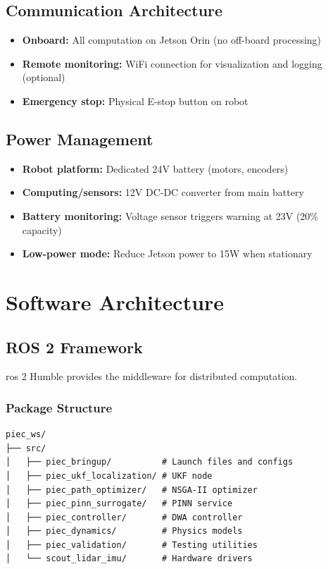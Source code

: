 \subsection{Communication Architecture}

\begin{itemize}
    \item \textbf{Onboard:} All computation on Jetson Orin (no off-board processing)
    \item \textbf{Remote monitoring:} WiFi connection for visualization and logging (optional)
    \item \textbf{Emergency stop:} Physical E-stop button on robot
\end{itemize}

\subsection{Power Management}

\begin{itemize}
    \item \textbf{Robot platform:} Dedicated 24V battery (motors, encoders)
    \item \textbf{Computing/sensors:} 12V DC-DC converter from main battery
    \item \textbf{Battery monitoring:} Voltage sensor triggers warning at 23V (20\% capacity)
    \item \textbf{Low-power mode:} Reduce Jetson power to 15W when stationary
\end{itemize}

\section{Software Architecture}
\label{sec:impl_software}

\subsection{ROS 2 Framework}

\acrshort{ros} 2 Humble provides the middleware for distributed computation.

\subsubsection{Package Structure}

\begin{verbatim}
piec_ws/
├── src/
│   ├── piec_bringup/          # Launch files and configs
│   ├── piec_ukf_localization/ # UKF node
│   ├── piec_path_optimizer/   # NSGA-II optimizer
│   ├── piec_pinn_surrogate/   # PINN service
│   ├── piec_controller/       # DWA controller
│   ├── piec_dynamics/         # Physics models
│   ├── piec_validation/       # Testing utilities
│   └── scout_lidar_imu/       # Hardware drivers
\end{verbatim}

